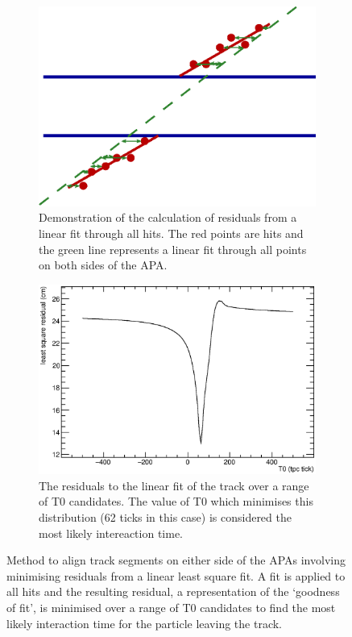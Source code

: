 \begin{figure}
  \centering
  \begin{subfigure}[t]{0.48\linewidth}
    \centering
    \includegraphics[width=\textwidth]{track_residual.eps}
    \caption{Demonstration of the calculation of residuals from a linear fit through all hits.  The red points are hits and the green line represents a linear fit through all points on both sides of the APA.}
    \label{fig:APACrossingAligmentLeastSqResidual}
  \end{subfigure}
  \hfill
  \begin{subfigure}[t]{0.48\linewidth}
    \centering
    \includegraphics[width=\textwidth]{chisquare.eps}
    \caption{The residuals to the linear fit of the track over a range of T0 candidates.  The value of T0 which minimises this distribution (62 ticks in this case) is considered the most likely intereaction time.}
    \label{fig:APACrossingAlignmentLeastSqMin}
  \end{subfigure}
  \caption[Method to align track segments on either side of the APAs involving minimising residuals from linear least square fit.]{Method to align track segments on either side of the APAs involving minimising residuals from a linear least square fit.  A fit is applied to all hits and the resulting residual, a representation of the `goodness of fit', is minimised over a range of T0 candidates to find the most likely interaction time for the particle leaving the track.}
  \label{fig:APACrossingAlignmentLeastSq}


\end{figure}
